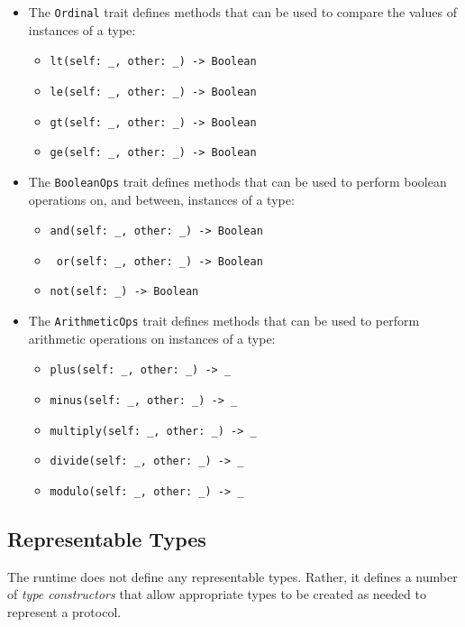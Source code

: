 \documentclass[10pt,twocolumn,a4paper]{article}
\newcommand{\code}[1]{\texttt{#1}}
\begin{document}
\begin{itemize}
  \item The \code{Ordinal} trait defines methods that can be used to
    compare the values of instances of a type:
    \begin{itemize}
      \item \texttt{lt(self: \_, other: \_) -> Boolean}
      \item \texttt{le(self: \_, other: \_) -> Boolean}
      \item \texttt{gt(self: \_, other: \_) -> Boolean}
      \item \texttt{ge(self: \_, other: \_) -> Boolean}
    \end{itemize}

  \item The \code{BooleanOps} trait defines methods that can be used to
    perform boolean operations on, and between, instances of a type:
    \begin{itemize}
      \item \texttt{and(self: \_, other: \_) -> Boolean}
      \item \texttt{ or(self: \_, other: \_) -> Boolean}
      \item \texttt{not(self: \_) -> Boolean}
    \end{itemize}

  \item The \code{ArithmeticOps} trait defines methods that can be used to
    perform arithmetic operations on instances of a type:
    \begin{itemize}
      \item \texttt{plus(self: \_, other: \_) -> \_}
      \item \texttt{minus(self: \_, other: \_) -> \_}
      \item \texttt{multiply(self: \_, other: \_) -> \_}
      \item \texttt{divide(self: \_, other: \_) -> \_}
      \item \texttt{modulo(self: \_, other: \_) -> \_}
    \end{itemize}

\end{itemize}

\subsection{Representable Types}
\label{sec:representable}

The runtime does not define any representable types. Rather, it defines
a number of \emph{type constructors} that allow appropriate types to be
created as needed to represent a protocol.
\end{document}
